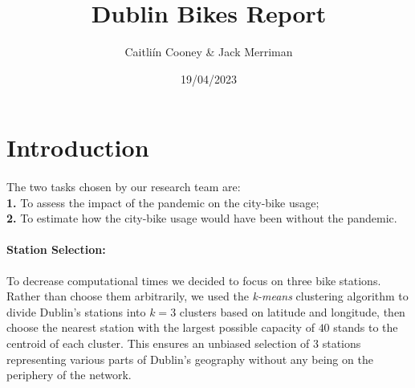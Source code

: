\documentclass[12pt,letterpaper]{article}
\title{Dublin Bikes Report}
\date{19/04/2023}
\author{Caitliín Cooney \& Jack Merriman}
\begin{document}
\maketitle

	\section{Introduction}
	
	\paragraph{}
	\noindent The two tasks chosen by our research team are:\\
	\textbf{1.} To assess the impact of the pandemic on the city-bike usage;\\
	\textbf{2.} To estimate how the city-bike usage would have been without the pandemic.\\
	
	\paragraph{Station Selection:}
	To decrease computational times we decided to focus on three bike stations. Rather than choose them arbitrarily, we used the \textit{k-means} clustering algorithm to divide Dublin's stations into $k = 3$ clusters based on latitude and longitude, then choose the nearest station with the largest possible capacity of $40$ stands to the centroid of each cluster. This ensures an unbiased selection of 3 stations representing various parts of Dublin's geography without any being on the periphery of the network.\\
	
	
	
	
\end{document}
